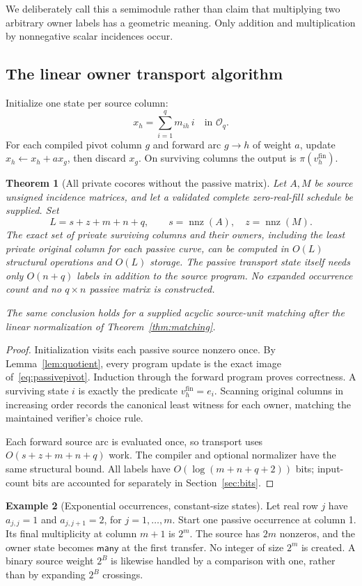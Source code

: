 \documentclass[11pt,letterpaper]{article}
\newtheorem{theorem}{Theorem}[section]
\theoremstyle{definition}
\newtheorem{example}[theorem]{Example}
\newcommand{\clash}{\mathsf{many}}
\newcommand{\nnz}{\operatorname{nnz}}
\begin{document}
We deliberately call this a semimodule rather than claim that multiplying two arbitrary owner labels has a geometric meaning. Only addition and multiplication by nonnegative scalar incidences occur.

\subsection{The linear owner transport algorithm}
Initialize one state per source column:
\[
 x_h=\sum_{i=1}^q m_{ih}\,i\quad\text{in }\mathcal O_q.
\]
For each compiled pivot column $g$ and forward arc $g\to h$ of weight $a$, update $x_h\gets x_h+a x_g$, then discard $x_g$. On surviving columns the output is $\pi(v_h^{\mathrm{fin}})$.

\begin{theorem}[All private cocores without the passive matrix]\label{thm:linear}
Let $A,M$ be source unsigned incidence matrices, and let a validated complete zero-real-fill schedule be supplied. Set
\[
 L=s+z+m+n+q,\qquad s=\nnz(A),\quad z=\nnz(M).
\]
The exact set of private surviving columns and their owners, including the least private original column for each passive curve, can be computed in $O(L)$ structural operations and $O(L)$ storage. The passive transport state itself needs only $O(n+q)$ labels in addition to the source program. No expanded occurrence count and no $q\times n$ passive matrix is constructed.

The same conclusion holds for a supplied acyclic source-unit matching after the linear normalization of Theorem~\ref{thm:matching}.
\end{theorem}
\begin{proof}
Initialization visits each passive source nonzero once. By Lemma~\ref{lem:quotient}, every program update is the exact image of~\eqref{eq:passivepivot}. Induction through the forward program proves correctness. A surviving state $i$ is exactly the predicate $v_h^{\mathrm{fin}}=e_i$. Scanning original columns in increasing order records the canonical least witness for each owner, matching the maintained verifier's choice rule.

Each forward source arc is evaluated once, so transport uses $O(s+z+m+n+q)$ work. The compiler and optional normalizer have the same structural bound. All labels have $O(\log(m+n+q+2))$ bits; input-count bits are accounted for separately in Section~\ref{sec:bits}.
\end{proof}

\begin{example}[Exponential occurrences, constant-size states]
Let real row $j$ have $a_{j,j}=1$ and $a_{j,j+1}=2$, for $j=1,\ldots,m$. Start one passive occurrence at column 1. Its final multiplicity at column $m+1$ is $2^m$. The source has $2m$ nonzeros, and the owner state becomes $\clash$ at the first transfer. No integer of size $2^m$ is created. A binary source weight $2^B$ is likewise handled by a comparison with one, rather than by expanding $2^B$ crossings.
\end{example}
\end{document}
